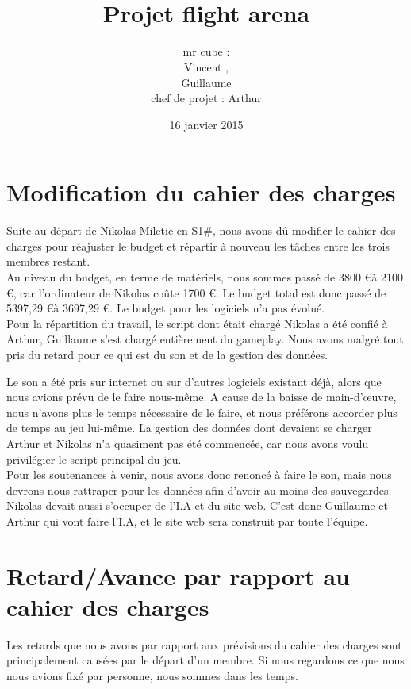 \documentclass[10pt, titlepage]{report}
\title{\bsc{cahier des charges}\\Projet flight arena}
\author{mr cube :\\
Vincent \bsc{Rospini-Clerici},\\
Guillaume \bsc{Rebut}\\
chef de projet : Arthur \bsc{Remaud}}
\date{16 janvier 2015}
\begin{document}
\maketitle
\renewcommand{\contentsname}{Sommaire}
\renewcommand{\chaptername}{Partie}

\tableofcontents

\chapter{Modification du cahier des charges}
Suite au départ de Nikolas Miletic en S1\#, nous avons dû modifier le cahier des charges pour réajuster le budget et répartir à nouveau les tâches entre les trois membres restant.\\

Au niveau du budget, en terme de matériels, nous sommes passé de 3800 \euro à 2100 \euro, car l'ordinateur de Nikolas coûte 1700 \euro. Le budget total est donc passé de 5397,29 \euro à 3697,29 \euro. Le budget pour les logiciels n'a pas évolué.\\

Pour la répartition du travail, le script dont était chargé Nikolas a été confié à Arthur, Guillaume s'est chargé entièrement du gameplay. Nous avons malgré tout pris du retard pour ce qui est du son et de la gestion des données.

Le son a été pris sur internet ou sur d'autres logiciels existant déjà, alors que nous avions prévu de le faire nous-même. A cause de la baisse de main-d'œuvre, nous n'avons plus le temps nécessaire de le faire, et nous préférons accorder plus de temps au jeu lui-même. La gestion des données dont devaient se charger Arthur et Nikolas n'a quasiment pas été commencée, car nous avons voulu privilégier le script principal du jeu.\\

Pour les soutenances à venir, nous avons donc renoncé à faire le son, mais nous devrons nous rattraper pour les données afin d'avoir au moins des sauvegardes. Nikolas devait aussi s'occuper de l'I.A et du site web. C'est donc Guillaume et Arthur qui vont faire l'I.A, et le site web sera construit par toute l'équipe.\\

\chapter{Retard/Avance par rapport au cahier des charges}
Les retards que nous avons par rapport aux prévisions du cahier des charges sont principalement causées par le départ d'un membre. Si nous regardons ce que nous nous avions fixé par personne, nous sommes dans les temps. 
\end{document}
